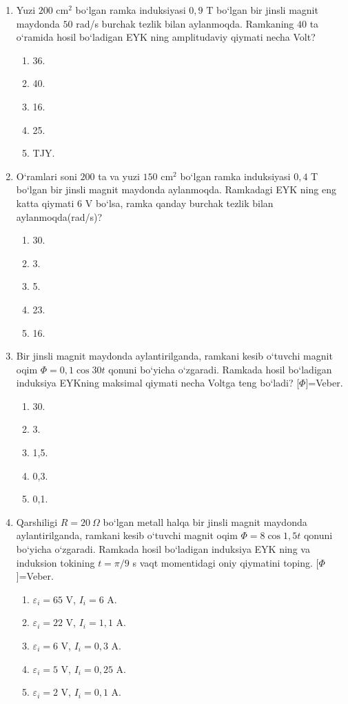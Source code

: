 \begin{enumerate}
\item Yuzi $200$ cm$^2$ bo‘lgan ramka induksiyasi $0,9$ T bo‘lgan bir jinsli magnit maydonda $50$ rad/s burchak tezlik bilan aylanmoqda. Ramkaning $40$ ta o‘ramida hosil bo‘ladigan EYK ning amplitudaviy qiymati necha Volt?
\begin{enumerate}[label=\Alph*)]
\item 36.
\item 40.
\item 16.
\item 25.
\item TJY.
\end{enumerate}

\item O‘ramlari soni $200$ ta va yuzi $150$ cm$^2$ bo‘lgan ramka induksiyasi $0,4$ T bo‘lgan bir jinsli magnit maydonda aylanmoqda. Ramkadagi EYK ning eng katta qiymati $6$ V bo‘lsa, ramka qanday burchak tezlik bilan aylanmoqda(rad/s)?
\begin{enumerate}[label=\Alph*)]
\item 30.
\item 3.
\item 5.
\item 23.
\item 16.
\end{enumerate}

\item Bir jinsli magnit maydonda aylantirilganda, ramkani kesib o‘tuvchi magnit oqim $\Phi=0,1\cos30t$ qonuni bo‘yicha o‘zgaradi. Ramkada hosil bo‘ladigan induksiya EYKning maksimal qiymati necha Voltga teng bo‘ladi? [$\Phi$]=Veber.
\begin{enumerate}[label=\Alph*)]
\item 30.
\item 3.
\item 1,5.
\item 0,3.
\item 0,1.
\end{enumerate}

\item Qarshiligi $R=20~\Omega$ bo‘lgan metall halqa bir jinsli magnit maydonda aylantirilganda, ramkani kesib o‘tuvchi magnit oqim $\Phi=8\cos1,5t$ qonuni bo‘yicha o‘zgaradi. Ramkada hosil bo‘ladigan induksiya EYK ning va induksion tokining $t=\pi/9$ s vaqt momentidagi oniy qiymatini toping. [$\Phi$]=Veber.
\begin{enumerate}[label=\Alph*)]
\item $\varepsilon_i=65$ V, $I_i=6$ A.
\item $\varepsilon_i=22$ V, $I_i=1,1$ A.
\item $\varepsilon_i=6$ V, $I_i=0,3$ A.
\item $\varepsilon_i=5$ V, $I_i=0,25$ A.
\item $\varepsilon_i=2$ V, $I_i=0,1$ A.
\end{enumerate}


\end{enumerate}
